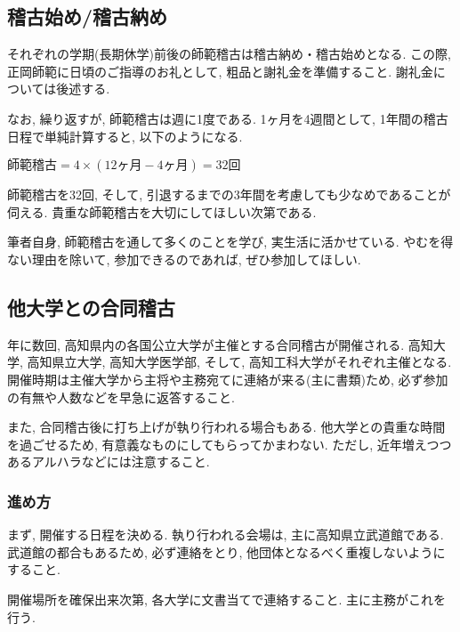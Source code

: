 \documentclass[a4j,titlepage]{jarticle}
\begin{document}
\subsection{稽古始め/稽古納め}
それぞれの学期(長期休学)前後の師範稽古は稽古納め・稽古始めとなる. この際, 正岡師範に日頃のご指導のお礼として, 粗品と謝礼金を準備すること. 謝礼金については後述する. \par
なお, 繰り返すが, 師範稽古は週に1度である. 1ヶ月を4週間として, 1年間の稽古日程で単純計算すると, 以下のようになる.

\begin{center}
  \begin{math}
    師範稽古 = 4 \times (12ヶ月 - 4ヶ月)
    = 32回
  \end{math}
\end{center}

師範稽古を32回, そして, 引退するまでの3年間を考慮しても少なめであることが伺える. 貴重な師範稽古を大切にしてほしい次第である. \par
筆者自身, 師範稽古を通して多くのことを学び, 実生活に活かせている. やむを得ない理由を除いて, 参加できるのであれば, ぜひ参加してほしい.

\subsection{他大学との合同稽古}
年に数回, 高知県内の各国公立大学が主催とする合同稽古が開催される. 高知大学, 高知県立大学, 高知大学医学部, そして, 高知工科大学がそれぞれ主催となる. 開催時期は主催大学から主将や主務宛てに連絡が来る(主に書類)ため, 必ず参加の有無や人数などを早急に返答すること. \par
また, 合同稽古後に打ち上げが執り行われる場合もある. 他大学との貴重な時間を過ごせるため, 有意義なものにしてもらってかまわない. ただし, 近年増えつつあるアルハラなどには注意すること.

\subsubsection{進め方}
まず, 開催する日程を決める. 執り行われる会場は, 主に高知県立武道館である. 武道館の都合もあるため, 必ず連絡をとり, 他団体となるべく重複しないようにすること. \par
開催場所を確保出来次第, 各大学に文書当てで連絡すること. 主に主務がこれを行う. 
\end{document}
